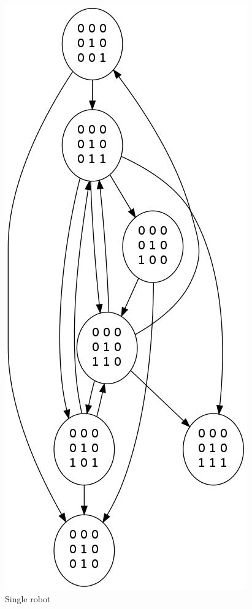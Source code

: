 \documentclass[11pt, a4paper]{article}
\theoremstyle{plain}
\theoremstyle{definition}
\theoremstyle{remark}
\begin{document}
\begin{figure}
\includegraphics[scale=0.50]{graph_single_all.jpg}
\caption{Single robot}
\label{graph:single}
\end{figure}

\end{document}

